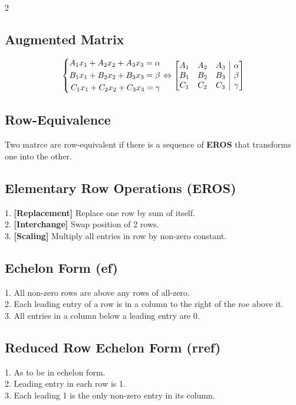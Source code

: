 \documentclass[5pt]{article}
\makeatletter
\newenvironment{amatrix}[1]{%
  \left[\begin{array}{@{}*{#1}{c}|c@{}}
}{%
  \end{array}\right]
}
\makeatother
\begin{document}
\begin{multicols}{2}
\subsection{Augmented Matrix}
\begin{equation}
\left\{\begin{split}
A_1x_1+A_2x_2+A_3x_3=\alpha \\
B_1x_1+B_2x_2+B_3x_3=\beta \\
C_1x_1+C_2x_2+C_3x_3=\gamma \\
\end{split}\right.
\Leftrightarrow
\begin{amatrix}{3}
    A_1 & A_2 & A_3 & \alpha \\
    B_1 & B_2 & B_3 & \beta \\
    C_1 & C_2 & C_3 & \gamma \\
 \end{amatrix}
\end{equation}


\subsection{Row-Equivalence}
Two matrce are row-equivalent if there is a sequence of \textbf{EROS} that transforms one into the other.


\subsection{Elementary Row Operations (EROS)}
1. \textbf{[Replacement]} Replace one row by sum of itself. \\
2. \textbf{[Interchange]} Swap position of 2 rows. \\
3. \textbf{[Scaling]} Multiply all entries in row by non-zero constant. \\


\subsection{Echelon Form (ef)}
1. All non-zero rows are above any rows of all-zero. \\
2. Each leading entry of a row is in a column to the right of the roe above it. \\
3. All entries in a column below a leading entry are 0. \\


\subsection{Reduced Row Echelon Form (rref)}
1. As to be in echelon form. \\
2. Leading entry in each row is 1. \\
3. Each leading 1 is the only non-zero entry in its column. \\



\end{multicols}
\end{document}
